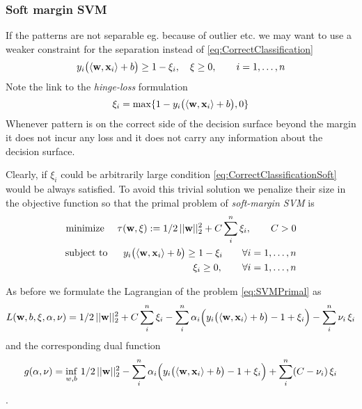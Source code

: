 \subsubsection{Soft margin SVM}\label{sec:SoftMarginSVM}
If the patterns are not separable eg. because of outlier etc. we may want to use a weaker constraint for the separation instead of \eqref{eq:CorrectClassification}
\begin{equation}\label{eq:CorrectClassificationSoft}
y_i \big( \langle \mathbf{w},\mathbf{x}_i \rangle + b \big) \geq 1 - \xi_i, \quad \xi \geq 0, \qquad i=1,\ldots,n
\end{equation}
Note the link to the \emph{hinge-loss} formulation
\begin{equation}\label{eq:HingeLoss}
\xi_i = \max \{ 1 - y_i \big( \langle \mathbf{w},\mathbf{x}_i \rangle + b \big),0 \}
\end{equation}
Whenever pattern is on the correct side of the decision surface beyond the margin it does not incur any loss and it does not carry any information about the decision surface.

Clearly, if $\xi_i$ could be arbitrarily large condition \eqref{eq:CorrectClassificationSoft} would be always satisfied.
To avoid this trivial solution we penalize their size in the objective function so that the primal problem of \emph{soft-margin SVM} is 
\begin{eqnarray}\label{eq:SoftSVMPrimal}\index{Soft-margin SVM primal problem}
  \text{minimize }  & & \tau(\vc{w},\vc{\xi}):= 1/2 \, ||\vc{w}||_2^2 + C \sum_i^n \xi_i, \qquad C>0 \nonumber \\
  \text{subject to} & & y_i \big( \langle \vc{w},\vc{x}_i \rangle + b \big) \geq 1 - \xi_i
\qquad \forall i=1,\ldots,n \nonumber \\
& & \xi_i \geq 0, \qquad \forall i=1,\ldots,n 
\end{eqnarray}

As before we formulate the Lagrangian of the problem \eqref{eq:SVMPrimal} as
\begin{equation}\label{eq:SoftSVMLagrangian}\index{Soft SVM Lagrangian}
L(\vc{w},b,\vc{\xi},\vc{\alpha},\vc{\nu}) =  1/2 \, ||\vc{w}||_2^2 + C \sum_i^n \xi_i
- \sum_i^n \alpha_i \Big( y_i \big( \langle \vc{w},\vc{x}_i \rangle + b \big) - 1 + \xi_i\Big)  - \sum_i^n \nu_i \, \xi_i
\end{equation}
and the corresponding dual function
\begin{equation}\label{eq:SoftSVMDualFce}\index{Soft-margin SVM dual function}
  g(\vc{\alpha},\vc{\nu}) =  \inf_{w,b} \, 1/2 \, ||\vc{w}||_2^2 
- \sum_i^n \alpha_i \Big( y_i \big( \langle \vc{w},\vc{x}_i \rangle + b \big) - 1 + \xi_i\Big)  + \sum_i^n (C -\nu_i) \, \xi_i
\end{equation}. 

